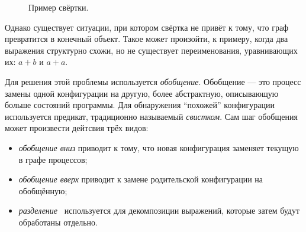 \begin{figure}[h!]
\center
{}

\label{fig:pgraphFoldingExample}
\caption{Пример свёртки.}
\end{figure}

Однако существует ситуации, при котором свёртка не привёт к тому, что граф превратится в
конечный объект. Такое может произойти, к примеру, когда два выражения структурно
схожи, но не существует переименования, уравнивающих их: $a + b$ и $a + a$.

Для решения этой проблемы используется \emph{обобщение}\cite{scGen}. Обобщение --- это процесс
замены одной конфигурации на другую, более абстрактную, описывающую больше состояний
программы. Для обнаружения ``похожей'' конфигурации используется предикат,
традиционно называемый \emph{свистком}. Сам шаг обобщения может произвести дейтсвия трёх видов:
\begin{itemize}
\item \emph{обобщение вниз} приводит к тому, что новая конфигурация заменяет текущую в графе процессов;
\item \emph{обобщение вверх} приводит к замене родительской конфигурации на обобщённую;
\item \emph{разделение}~ используется для декомпозиции выражений, которые затем
будут обработаны отдельно.
\end{itemize}

